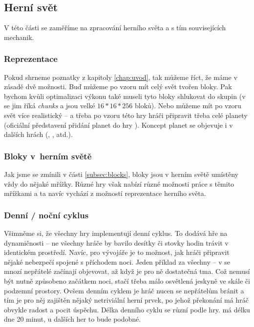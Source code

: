 \subsection{Herní svět}

V této části se zaměříme na zpracování herního světa a s tím souvisejících mechanik.

\subsubsection{Reprezentace}

Pokud shrneme poznatky z kapitoly \ref{chap:uvod}, tak můžeme říct, že máme v zásadě dvě možnosti. Buď můžeme po vzoru \MC{} mít celý svět tvořen bloky. Pak bychom kvůli optimalizaci výkonu také museli tyto bloky shlukovat do skupin (v  se jim říká \textit{chunks} a jsou velké $16*16*256$ bloků). Nebo můžeme mít po vzoru \SE{} svět více realistický -- a třeba po vzoru této hry hráči připravit třeba celé planety (oficiální představení přidání planet do hry \citep{se_planets}). Koncept planet se objevuje i v dalších hrách (\ME{}, \NMS{}, atd.).

\subsubsection{Bloky v~herním světě}

Jak jsme se zmínili v části \ref{subsec:blocks}, bloky jsou v herním světě umístěny vždy do nějaké mřížky. Různé hry však nabízí různé možnosti práce s těmito mřížkami a ta navíc vychází z možností reprezentace herního světa.


\subsubsection{Denní / noční cyklus}

Všimněme si, že všechny hry implementují denní cyklus. To dodává hře na dynamičnosti -- ne všechny hráče by bavilo desítky či stovky hodin trávit v identickém prostředí. Navíc, pro vývojáře je to možnost, jak hráči připravit nějaké nebezpečí spojené s příchodem noci. Jeden příklad za všechny -- v  se mnozí nepřátelé začínají objevovat, až když je pro ně dostatečná tma. Což nemusí být nutně způsobeno začátkem noci, stačí třeba málo osvětlená jeskyně ve skále či podzemní prostory. Ovšem denním cyklem je hráč nucen se nepřátelům bránit a tím je pro něj zajištěn nějaký netriviální herní prvek, po jehož překonání má hráč obvykle radost a pocit úspěchu.
Délka denního cyklu se různí podle hry. \MC{} má délku dne 20 minut, u dalších her to bude podobné.


